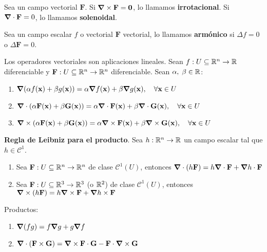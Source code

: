 \begin{definition}
    Sea un campo vectorial $\mathbf{F}$. Si $\grad\times\mathbf{F}=\mathbf{0}$, lo llamamos \textbf{irrotacional}. Si $\grad\cdot\mathbf{F}=0$, lo llamamos \textbf{solenoidal}.
\end{definition}
\begin{definition}
    Sea un campo escalar $f$ o vectorial $\mathbf{F}$ vectorial, lo llamamos \textbf{arm\'onico} si $\Delta f=0$ o $\Delta \mathbf{F}=0$.
\end{definition}
\begin{propertie}
    Los operadores vectoriales son aplicaciones lineales. Sean $f:U\subseteq\mathbb{R}^n\to\mathbb{R}$ diferenciable y $\mathbf{F}:U\subseteq\mathbb{R}^n\to\mathbb{R}^n$ diferenciable. Sean $\alpha,\;\beta\in\mathbb{R}$:
    \begin{enumerate}
        \item \(\grad(\alpha f(\mathbf{x})+\beta g(\mathbf{x}))=\alpha\grad f(\mathbf{x})+\beta\grad g(\mathbf{x}),\quad\forall\mathbf{x}\in U\)
        \item \(\grad\cdot(\alpha \mathbf{F}(\mathbf{x})+\beta \mathbf{G}(\mathbf{x}))=\alpha\grad\cdot\mathbf{F}(\mathbf{x})+\beta\grad\cdot\mathbf{G}(\mathbf{x}),\quad\forall\mathbf{x}\in U\)
        \item \(\grad\times(\alpha \mathbf{F}(\mathbf{x})+\beta \mathbf{G}(\mathbf{x}))=\alpha\grad\times\mathbf{F}(\mathbf{x})+\beta\grad\times\mathbf{G}(\mathbf{x}),\quad\forall\mathbf{x}\in U\)
    \end{enumerate}
\end{propertie}
\begin{propertie}
    \textbf{Regla de Leibniz para el producto}. Sea $h:\mathbb{R}^n\to\mathbb{R}$ un campo escalar tal que $h\in \mathcal{C}^1$.
    \begin{enumerate}
        \item Sea $\mathbf{F}:U\subseteq\mathbb{R}^n\to\mathbb{R}^n$ de clase $\mathcal{C}^1(U)$, entonces $\grad\cdot(h\mathbf{F})=h\grad\cdot\mathbf{F}+\grad h\cdot\mathbf{F}$
        \item Sea $\mathbf{F}:U\subseteq\mathbb{R}^3\to\mathbb{R}^3$ (o $\mathbb{R}^2$) de clase $\mathcal{C}^1(U)$, entonces $\grad\times(h\mathbf{F})=h\grad\times\mathbf{F}+\grad h\times\mathbf{F}$
    \end{enumerate}
\end{propertie}
\begin{propertie}
    Productos:
    \begin{enumerate}
        \item $\grad(fg)=f\grad g+g\grad f$
        \item $\grad\cdot(\mathbf{F}\times\mathbf{G})=\grad\times\mathbf{F}\cdot\mathbf{G}-\mathbf{F}\cdot\grad\times\mathbf{G}$
    \end{enumerate}
\end{propertie}